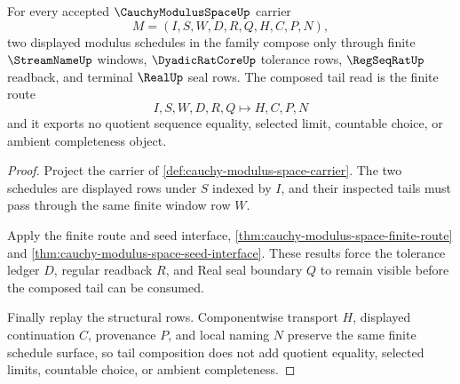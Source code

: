 \begin{theorem}
\label{thm:cauchy-modulus-space-tail-composition}
For every accepted $\CauchyModulusSpaceUp$ carrier
$$
M=(I,S,W,D,R,Q,H,C,P,N),
$$
two displayed modulus schedules in the family compose only through finite $\StreamNameUp$ windows, $\DyadicRatCoreUp$ tolerance rows, $\RegSeqRatUp$ readback, and terminal $\RealUp$ seal rows. The composed tail read is the finite route
$$
I,S,W,D,R,Q \longmapsto H,C,P,N
$$
and it exports no quotient sequence equality, selected limit, countable choice, or ambient completeness object.
\end{theorem}
\begin{proof}
Project the carrier of \autoref{def:cauchy-modulus-space-carrier}. The two schedules are displayed rows under $S$ indexed by $I$, and their inspected tails must pass through the same finite window row $W$.

Apply the finite route and seed interface, \autoref{thm:cauchy-modulus-space-finite-route} and \autoref{thm:cauchy-modulus-space-seed-interface}. These results force the tolerance ledger $D$, regular readback $R$, and Real seal boundary $Q$ to remain visible before the composed tail can be consumed.

Finally replay the structural rows. Componentwise transport $H$, displayed continuation $C$, provenance $P$, and local naming $N$ preserve the same finite schedule surface, so tail composition does not add quotient equality, selected limits, countable choice, or ambient completeness.
\end{proof}

